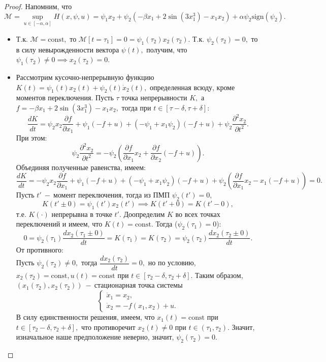 \documentclass{article}
\begin{document}
\begin{proof}
Напомним, что 
$$\mathcal{M} = \sup_{u\in[-\alpha, \alpha]}H(x, \psi, u) = \psi_1x_2+\psi_2(-\beta x_1 + 2\sin(3x_1^3) - x_1x_2) +\alpha\psi_2\text{sign}(\psi_2).$$
\begin{itemize}
    \item [1.] Т.к. $\mathcal{M} = \text{const},$ то $\mathcal{M}[t=\tau_1] = 0 = \psi_1(\tau_2)x_2(\tau_2).$ Т.к. $\psi_2(\tau_2) = 0,$ то в силу невырожденности вектора $\psi(t),$ получим, что $\psi_1(\tau_2) \neq 0 \implies x_2(\tau_2)=0.$
    \item [2.] Рассмотрим кусочно-непрерывную функцию $K(t) = \psi_1(t)x_2(t) + \psi_2(t)\dot{x}_2(t),$ определенная всюду, кроме моментов переключения. Пусть $\tau$ точка непрерывности $K,$ а $f = -\beta x_1+2\sin(3x_1^3)-x_1x_2,$ тогда при $t\in[\tau-\delta, \tau+\delta]:$
    $$\dfrac{dK}{dt} = \psi_2x_2\dfrac{\partial f}{\partial x_1}+\psi_1(-f + u) +(-\psi_1+x_1\psi_2)(-f+u)+\psi_2\dfrac{\partial^2 x_2}{\partial t^2}.$$
    При этом:
    $$\psi_2\dfrac{\partial^2 x_2}{\partial t^2} = -\psi_2\left(\dfrac{\partial f}{\partial x_1} x_2 + \dfrac{\partial f}{\partial x_2}(-f+u)\right).$$
    Объединяя полученные равенства, имеем:
    $$\dfrac{dK}{dt} = -\psi_2x_2\dfrac{\partial f}{\partial x_1}+\psi_1(-f + u) +(-\psi_1+x_1\psi_2)(-f+u)+ \psi_2\left(\dfrac{\partial f}{\partial x_1} x_2 - x_1(-f+u)\right)= 0.$$
    Пусть $t'~-~$момент переключения, тогда из ПМП $\psi_2(t')=0$,
    $$K(t'\pm 0) = \psi_1(t')x_2(t') \implies K(t'+0)=K(t'-0),$$
    т.е. $K(\cdot)$ непрерывна в точке $t'.$
    Доопределим $K$ во всех точках переключений и имеем, что $K(t) = \text{const}.$ Тогда ($\psi_2(\tau_1) = 0$):
    $$0 = \psi_2(\tau_1)\dfrac{dx_2(\tau_1\pm0)}{dt} = K(\tau_1) = K(\tau_2) = \psi_2(\tau_2)\dfrac{dx_2(\tau_2\pm0)}{dt}.$$
    От противного: \\
    Пусть $\psi_2(\tau_2) \neq 0,$ тогда $\dfrac{dx_2(\tau_2)}{dt} = 0,$ но по условию, $x_2(\tau_2) = \text{const}, u(t) = \text{const}$ при $t\in [\tau_2-\delta, \tau_2+\delta].$ Таким образом, $(x_1(\tau_2), x_2(\tau_2))~-~$стационарная точка системы
    $$
    \begin{cases}
        \dot{x}_1 = x_2,\\
        \dot{x}_2 = -f(x_1, x_2)+u.
    \end{cases}
    $$
    В силу единственности решения, имеем, что $x_1(t)= \text{const}$ при $t\in [\tau_2-\delta, \tau_2+\delta],$ что противоречит $x_2(t) \neq 0$ при $t\in(\tau_1, \tau_2).$ Значит, изначальное наше предположение неверно, значит, $\psi_2(\tau_2) = 0.$

\end{itemize}
\end{proof}
\end{document}
